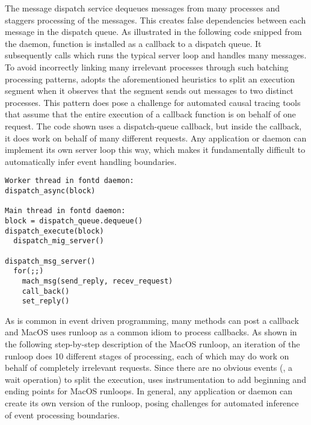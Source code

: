 The message dispatch service dequeues messages from many processes and staggers
processing of the messages. This creates false dependencies between each
message in the dispatch queue.  As illustrated in the following code snipped
from the  daemon, function  is installed as a
callback to a dispatch queue.  It subsequently calls
 which runs the typical server loop and handles many
messages.
To avoid incorrectly linking many irrelevant processes through such
batching processing patterns, \xxx adopts the aforementioned heuristics to
split an execution segment when it observes that the segment sends out messages
to two distinct processes.
This pattern does pose a challenge for automated causal tracing tools that
assume that the entire execution of a callback function is on behalf of one
request.  The code shown uses a dispatch-queue callback, but inside the
callback, it does work on behalf of many different requests.  Any application
or daemon can implement its  own server loop this way, which makes it
fundamentally difficult to automatically infer event handling boundaries.

{\footnotesize \begin{verbatim}
Worker thread in fontd daemon:
dispatch_async(block)

Main thread in fontd daemon:
block = dispatch_queue.dequeue()
dispatch_execute(block)
  dispatch_mig_server()

dispatch_msg_server()
  for(;;)
    mach_msg(send_reply, recev_request)
    call_back()
    set_reply()
\end{verbatim}
}

As is common in event driven programming, many methods can post a callback and
MacOS uses runloop as a common idiom to process callbacks.  As shown in the
following step-by-step description of the MacOS runloop, an iteration of the
runloop does 10 different stages of processing, each of which may do work on
behalf of completely irrelevant requests.  Since there are no obvious events
(\eg, a wait operation) to split the execution, \xxx uses instrumentation to
add beginning and ending points for MacOS runloops.  In general, any
application or daemon can create its own version of the runloop, posing
challenges for automated inference of event processing boundaries.

